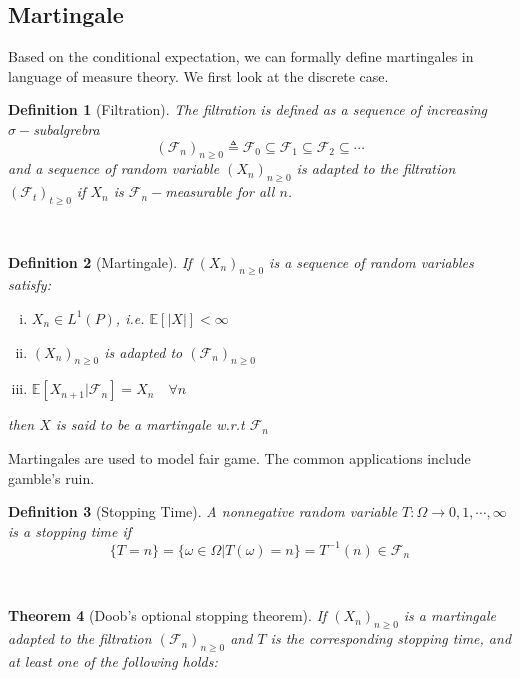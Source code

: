 \documentclass[11pt,english]{smfart}
\newtheorem{theorem}{Theorem}[subsection]
\newtheorem{definition}[theorem]{Definition}
\newcommand{\mb}{\mathbb}
\newcommand{\xt}{\textit}
\begin{document}
\subsection{Martingale}
Based on the conditional expectation, we can formally define martingales in language of measure theory. We first look at the discrete case.
~\\
\begin{definition}[Filtration]
    The filtration is defined as a sequence of increasing $\sigma-$subalgrebra
    $$ (\mathcal{F}_n)_{n \ge 0} \triangleq \mathcal{F}_0 \subseteq \mathcal{F}_1 \subseteq \mathcal{F}_2 \subseteq \cdots$$ and 
    a sequence of random variable $(X_n)_{n \ge 0}$ is \xt{adapted} to the filtration $(\mathcal{F}_t)_{t \ge 0}$ if $X_n$ is $\mathcal{F}_n-$measurable for all $n$.
\end{definition}
~\\
\begin{definition}[Martingale]
    If $(X_n)_{n \ge 0}$ is a sequence of random variables satisfy:
    \begin{enumerate}[(i)]
        \item $X_n \in L^1(P)$, i.e. $\mb{E}[|X|] < \infty$
        \item $(X_n)_{n \ge 0}$ is adapted to $(\mathcal{F}_n)_{n\ge 0}$
        \item $\mb{E}[X_{n+1}|\mathcal{F}_n] = X_n  \quad \forall n$
    \end{enumerate}
    then $X$ is said to be a martingale w.r.t $\mathcal{F}_n$
\end{definition}
Martingales are used to model fair game. The common applications include gamble's ruin. 
~\\
\begin{definition}[Stopping Time]
    A nonnegative random variable $T:\Omega \rightarrow {0,1,\cdots,\infty}$ is a stopping time if
    $$\{T=n\} = \{\omega\in\Omega|T(\omega) = n\} = T^{-1}(n) \in \mathcal{F}_n$$
    
\end{definition}
~\\
\begin{theorem}[Doob's optional stopping theorem]
If $(X_n)_{n\ge 0}$ is a martingale adapted to the filtration $(\mathcal{F}_n)_{n\ge 0}$ and $T$ is the corresponding stopping time,
and at least one of the following holds:

    
\end{theorem}
\end{document}
